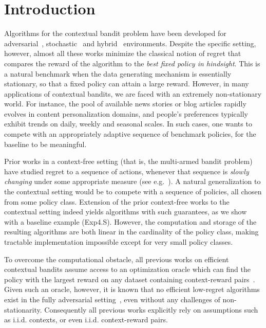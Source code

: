 \section{Introduction}

Algorithms for the contextual bandit problem have been developed for
adversarial~\citep{AuerCeFrSc02},
stochastic~\citep{AgarwalHsKaLaLiSc14,LangfordZh08} and
hybrid~\citep{RakhlinSr16,SyrgkanisLuKrSc16} environments. Despite the
specific setting, however, almost all these works minimize the
classical notion of regret that compares the reward of the algorithm
to the \emph{best fixed policy in hindsight}. This is a natural
benchmark when the data generating mechanism is essentially
stationary, so that a fixed policy can attain a large reward. However,
in many applications of contextual bandits, we are faced with an
extremely non-stationary world. For instance, the pool of available
news stories or blog articles rapidly evolves in content
personalization domains, and people's preferences typically exhibit
trends on daily, weekly and seasonal scales. In such cases, one wants
to compete with an appropriately adaptive sequence of benchmark
policies, for the baseline to be meaningful.

Prior works in a context-free setting (that is, the multi-armed bandit
problem) have studied regret to a sequence of actions, whenever that
sequence is \emph{slowly changing} under some appropriate measure (see
e.g.~\citep{AuerCeFrSc02, BesbesGuZe14, BesbesGuZe15, KarninAn16,
  WeiHoLu16}). A natural generalization to the contextual setting
would be to compete with a sequence of policies, all chosen from some
policy class. %
Extension of the prior context-free works to the contextual
setting indeed yields algorithms with such guarantees, as we show with
a baseline example (Exp4.S). However, the computation and storage of
the resulting algorithms are both linear in the cardinality of the
policy class, making tractable implementation impossible except for
very small policy classes.

To overcome the computational obstacle, all previous works on
efficient contextual bandits assume access to an optimization oracle
which can find the policy with the largest reward on any dataset
containing context-reward
pairs~\citep{LangfordZh08,AgarwalHsKaLaLiSc14,RakhlinSr16,SyrgkanisLuKrSc16}.
Given such an oracle, however, it is known that no efficient
low-regret algorithms exist in the fully adversarial
setting~\citep[Theorem 25]{Hazan2016}, even without any challenges of
non-stationarity. Consequently all previous works explicitly rely on
assumptions such as i.i.d. contexts, or even i.i.d. context-reward
pairs. 

